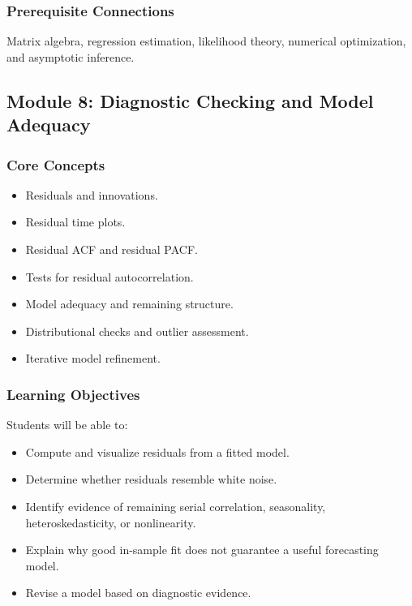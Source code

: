 \documentclass[11pt]{article}
\begin{document}
\subsubsection{Prerequisite Connections}

Matrix algebra, regression estimation, likelihood theory, numerical
optimization, and asymptotic inference.

\subsection{Module 8: Diagnostic Checking and Model Adequacy}

\subsubsection{Core Concepts}

\begin{itemize}
    \item Residuals and innovations.
    \item Residual time plots.
    \item Residual ACF and residual PACF.
    \item Tests for residual autocorrelation.
    \item Model adequacy and remaining structure.
    \item Distributional checks and outlier assessment.
    \item Iterative model refinement.
\end{itemize}

\subsubsection{Learning Objectives}

Students will be able to:

\begin{itemize}
    \item Compute and visualize residuals from a fitted model.
    \item Determine whether residuals resemble white noise.
    \item Identify evidence of remaining serial correlation, seasonality,
    heteroskedasticity, or nonlinearity.
    \item Explain why good in-sample fit does not guarantee a useful forecasting
    model.
    \item Revise a model based on diagnostic evidence.
\end{itemize}
\end{document}
